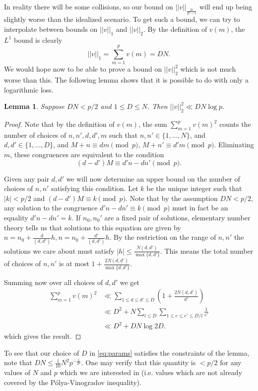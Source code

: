\documentclass[a4paper,11pt,twoside]{amsart}
\newtheorem{lemma}{Lemma}
\begin{document}
In reality there will be some collisions, so our bound on $||v||_{\frac{2r}{2r-1}}$ will end up being slightly worse than the idealized scenario. To get such a bound, we can try to interpolate between bounds on $||v||_1$ and $||v||_2$. By the definition of $v(m)$, the $L^1$ bound is clearly
\[
||v||_1 = \sum_{m=1}^p v(m) = DN.
\]
We would hope now to be able to prove a bound on $||v||_2^2$ which is not much worse than this. The following lemma shows that it is possible to do with only a logarithmic loss.

\begin{lemma}
Suppose $DN < p/2$ and $1 \leq D \leq N$. Then $||v||_2^2 \ll DN \log p$.
\end{lemma}
\begin{proof}
Note that by the definition of $v(m)$, the sum $\sum_{m=1}^p v(m)^2$ counts the number of choices of $n, n', d, d', m$ such that $n, n' \in \{1,\ldots, N\}$, and $d, d' \in \{1,\ldots, D\}$, and $M+n \equiv dm \pmod{p}$, $M+n' \equiv d'm \pmod{p}$. Eliminating $m$, these congruences are equivalent to the condition
\[
(d-d')M\equiv d'n-dn' \pmod{p}.
\]

Given any pair $d,d'$ we will now determine an upper bound on the number of choices of $n,n'$ satisfying this condition. Let $k$ be the unique integer such that $|k| <p/2$ and $(d-d')M \equiv k \pmod{p}$. Note that by the assumption $DN < p/2$, any solution to the congruence $d'n-dn' \equiv k \pmod{p}$ must in fact be an equality $d'n-dn' = k$. If $n_0, n_0'$ are a fixed pair of solutions, elementary number theory tells us that solutions to this equation are given by $n = n_0 + \frac{d}{(d,d')} h, n = n_0 + \frac{d'}{(d,d')} h$. By the restriction on the range of $n, n'$ the solutions we care about must satisfy $|h| \leq \frac{N (d,d')}{\max\{d,d'\}}$. This means the total number of choices of $n,n'$ is at most $1+\frac{2 N (d,d')}{\max\{d,d'\}}$.

Summing now over all choices of $d,d'$ we get
\begin{align*}
\sum_{m=1}^p v(m)^2 &\ll \sum_{1 \leq d \leq d' \leq D} \left(1+\frac{2 N (d,d')}{d'}\right) \\
&\ll D^2 + N \sum_{l \leq D} \sum_{1 \leq e \leq e' \leq D/l} \frac{1}{e'} \\
&\ll D^2 + DN \log 2D.
\end{align*}
which gives the result.
\end{proof}

To see that our choice of $D$ in \eqref{eq:params} satisfies the constraints of the lemma, note that $DN \leq \frac{1}{10}N^2 p^{-\frac{1}{2r}}$. One may verify that this quantity is $<p/2$ for any values of $N$ and $p$ which we are interested in (i.e. values which are not already covered by the P\'{o}lya-Vinogradov inequality).
\end{document}
